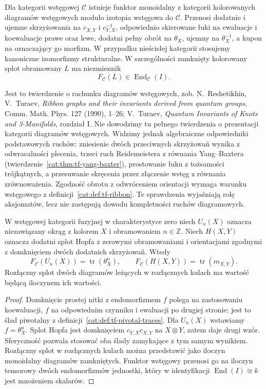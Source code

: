 \begin{twierdzenie}\label{cat:thm:tf-rt-tangle}
Dla kategorii wstęgowej $\mathcal C$ istnieje funktor monoidalny z kategorii kolorowanych diagramów wstęgowych modulo izotopia wstęgowa do $\mathcal C$. Przenosi dodatnie i ujemne skrzyżowania na $c_{X,Y}$ i $c_{Y,X}^{-1}$, odpowiednio skierowane łuki na ewaluacje i koewaluacje prawe oraz lewe, dodatni pełny obrót na $\theta_X$, ujemny na $\theta_X^{-1}$, a kupon na oznaczający go morfizm. W przypadku nieścisłej kategorii stosujemy kanoniczne izomorfizmy strukturalne. W szczególności zamknięty kolorowany splot obramowany $L$ ma niezmiennik
\[
 F_{\mathcal C}(L)\in\operatorname{End}_{\mathcal C}(I).
\]
\end{twierdzenie}

Jest to twierdzenie o rachunku diagramów wstęgowych, zob. N.~Reshetikhin, V.~Turaev, \emph{Ribbon graphs and their invariants derived from quantum groups}, Comm. Math. Phys. 127 (1990), 1--26; V.~Turaev, \emph{Quantum Invariants of Knots and 3-Manifolds}, rozdział I. Nie dowodzimy tu pełnego twierdzenia o prezentacji kategorii diagramów wstęgowych. Widzimy jednak algebraiczne odpowiedniki podstawowych ruchów: zniesienie dwóch przeciwnych skrzyżowań wynika z odwracalności plecenia, trzeci ruch Reidemeistera z równania Yang--Baxtera (twierdzenie~\ref{cat:thm:tf-yang-baxter}), prostowanie łuku z tożsamości trójkątnych, a przesuwanie skręcenia przez złączenie wstęg z równania zrównoważenia. Zgodność obrotu z odwróceniem orientacji wymaga warunku wstęgowego z definicji~\ref{cat:def:tf-ribbon}. Te sprawdzenia wyjaśniają rolę aksjomatów, lecz nie zastępują dowodu kompletności ruchów diagramowych.

\begin{stwierdzenie}\label{cat:prop:tf-rt-basic}
W wstęgowej kategorii fuzyjnej w charakterystyce zero niech $U_n(X)$ oznacza niezawiązany okrąg z kolorem $X$ i obramowaniem $n\in\mathbb Z$. Niech $H(X,Y)$ oznacza dodatni splot Hopfa z zerowymi obramowaniami i orientacjami zgodnymi z domknięciem dwóch dodatnich skrzyżowań. Wtedy
\[
 F_{\mathcal C}(U_n(X))=\operatorname{tr}(\theta_X^n),
 \qquad
 F_{\mathcal C}(H(X,Y))=\operatorname{tr}(m_{X,Y}).
\]
Rozłączny splot dwóch diagramów leżących w rozłącznych kulach ma wartość będącą iloczynem ich wartości.
\end{stwierdzenie}
\begin{proof}
Domknięcie prostej nitki z endomorfizmem $f$ polega na zastosowaniu koewaluacji, $f$ na odpowiednim czynniku i ewaluacji po drugiej stronie; jest to ślad piwotalny z definicji~\ref{cat:def:tf-pivotal-traces}. Dla $U_n(X)$ wstawiamy $f=\theta_X^n$. Splot Hopfa jest domknięciem $c_{Y,X}c_{X,Y}$ na $X\otimes Y$, zatem daje drugi wzór. Sferyczność pozwala stosować oba ślady zamykające z tym samym wynikiem. Rozłączny splot w rozłącznych kulach można przedstawić jako iloczyn monoidalny diagramów zamkniętych. Funktor wstęgowy przenosi go na iloczyn tensorowy dwóch endomorfizmów jednostki, który w identyfikacji $\operatorname{End}(I)\cong k$ jest mnożeniem skalarów.
\end{proof}

